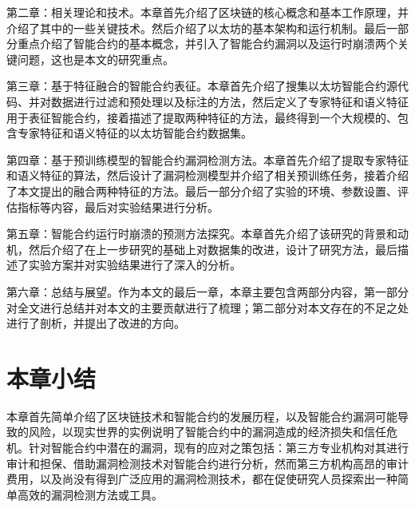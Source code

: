 第二章：相关理论和技术。本章首先介绍了区块链的核心概念和基本工作原理，并介绍了其中的一些关键技术。然后介绍了以太坊的基本架构和运行机制。最后一部分重点介绍了智能合约的基本概念，并引入了智能合约漏洞以及运行时崩溃两个关键问题，这也是本文的研究重点。

第三章：基于特征融合的智能合约表征。本章首先介绍了搜集以太坊智能合约源代码、并对数据进行过滤和预处理以及标注的方法，然后定义了专家特征和语义特征用于表征智能合约，接着描述了提取两种特征的方法，最终得到一个大规模的、包含专家特征和语义特征的以太坊智能合约数据集。

第四章：基于预训练模型的智能合约漏洞检测方法。本章首先介绍了提取专家特征和语义特征的算法，然后设计了漏洞检测模型并介绍了相关预训练任务，接着介绍了本文提出的融合两种特征的方法。最后一部分介绍了实验的环境、参数设置、评估指标等内容，最后对实验结果进行分析。

第五章：智能合约运行时崩溃的预测方法探究。本章首先介绍了该研究的背景和动机，然后介绍了在上一步研究的基础上对数据集的改进，设计了研究方法，最后描述了实验方案并对实验结果进行了深入的分析。

第六章：总结与展望。作为本文的最后一章，本章主要包含两部分内容，第一部分对全文进行总结并对本文的主要贡献进行了梳理；第二部分对本文存在的不足之处进行了剖析，并提出了改进的方向。

\section{本章小结}
\label{sec:本章小结1}
本章首先简单介绍了区块链技术和智能合约的发展历程，以及智能合约漏洞可能导致的风险，以现实世界的实例说明了智能合约中的漏洞造成的经济损失和信任危机。针对智能合约中潜在的漏洞，现有的应对之策包括：第三方专业机构对其进行审计和担保、借助漏洞检测技术对智能合约进行分析，然而第三方机构高昂的审计费用，以及尚没有得到广泛应用的漏洞检测技术，都在促使研究人员探索出一种简单高效的漏洞检测方法或工具。
